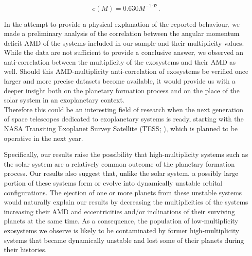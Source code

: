 \documentclass[letter]{aa} %
\begin{document}
\begin{equation}
e(M) = 0.630 M^{-1.02} \,
.\end{equation}
                
In the attempt to provide a physical explanation of the reported behaviour, we made a preliminary analysis of the correlation between the angular momentum deficit AMD of the systems included in our sample and their multiplicity values. While the data are not sufficient to provide a conclusive answer, we observed an anti-correlation between the multiplicity of the exosystems and their AMD as well. Should this AMD-multiplicity anti-correlation of exosystems be verified once larger and more precise datasets become available, it would provide us with a deeper insight both on the planetary formation process and on the place of the solar system in an exoplanetary context.\\
Therefore this could be an interesting field of research when the next generation of space telescopes dedicated to exoplanetary systems is ready, starting with the NASA Transiting Exoplanet Survey Satellite (TESS; \citealt{Ricker_TESS}), which is planned to be operative in the next year.
 
Specifically, our results raise the possibility that high-multiplicity systems such as the solar system are a relatively common outcome of the planetary formation process. Our results also suggest that, unlike the solar system, a possibly large portion of these systems form or evolve into dynamically unstable orbital configurations. The ejection of one or more planets from these unstable systems would naturally explain our results by decreasing the multiplicities of the systems increasing their AMD and eccentricities and/or inclinations of their surviving planets at the same time. As a consequence, the population of low-multiplicity exosystems we observe is likely to be contaminated by former high-multiplicity systems that became dynamically unstable and lost some of their planets during their histories.

        
        
\end{document}
